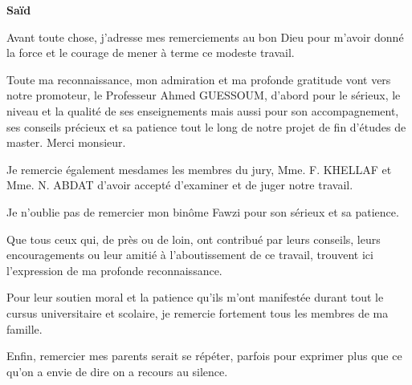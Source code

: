 
\begin{center}
    \Large
    \textbf{Saïd}
\end{center}

\vspace{1cm}

\setlength{\parindent}{0.5cm}
Avant toute chose, j'adresse mes remerciements au bon Dieu pour m'avoir donné la force et le courage de mener à terme ce modeste travail.

Toute ma reconnaissance, mon admiration et ma profonde gratitude vont vers notre promoteur, le Professeur Ahmed GUESSOUM, d'abord pour le sérieux, le niveau et la qualité de ses enseignements mais aussi pour son accompagnement, ses conseils précieux et sa patience tout le long de notre projet de fin d'études de master. Merci monsieur.

Je remercie également mesdames les membres du jury, Mme. F. KHELLAF et Mme. N. ABDAT d'avoir accepté d'examiner et de juger notre travail.

Je n'oublie pas de remercier mon binôme Fawzi pour son sérieux et sa patience.

Que tous ceux qui, de près ou de loin, ont contribué par leurs conseils, leurs encouragements ou leur amitié à l'aboutissement de ce travail, trouvent ici l'expression de ma profonde reconnaissance.

Pour leur soutien moral et la patience qu'ils m'ont manifestée durant tout le cursus universitaire et scolaire, je remercie fortement tous les membres de ma famille.

Enfin, remercier mes parents serait se répéter, parfois pour exprimer plus que ce qu'on a envie de dire on a recours au silence.
